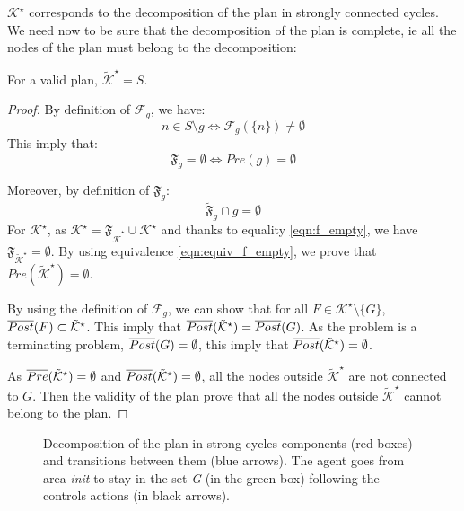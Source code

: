 $\mathcal{K}^\star$ corresponds to the decomposition of the plan in strongly connected cycles.
We need now to be sure that the decomposition of the plan is complete, ie all the nodes of the plan must belong to the decomposition:
\begin{prop}
For a valid plan, $\tilde{\mathcal{K}}^\star = S$.
\end{prop}
\begin{proof}

By definition of $\mathcal{F}_g$, we have:
\begin{equation}
n \in S \setminus g \Leftrightarrow \mathcal{F}_g(\{n\}) \neq \emptyset
\end{equation}
This imply that:
\begin{equation} \label{eqn:equiv_f_empty}
\mathfrak{F}_g = \emptyset \Leftrightarrow Pre(g) = \emptyset
\end{equation}

Moreover, by definition of $\mathfrak{F}_g$:
\begin{equation} \label{eqn:f_empty}
\tilde{\mathfrak{F}}_g \cap g = \emptyset
\end{equation}
For $\mathcal{K}^\star$, as $\mathcal{K}^\star = \mathfrak{F}_{\tilde{\mathcal{K}}^\star} \cup \mathcal{K}^\star$ and thanks to equality \ref{eqn:f_empty}, we have $\mathfrak{F}_{\tilde{\mathcal{K}}^\star} = \emptyset$.  
By using equivalence \ref{eqn:equiv_f_empty}, we prove that $Pre(\tilde{\mathcal{K}}^\star) = \emptyset$.

By using the definition of $\mathcal{F}_g$,
we can show that for all $F \in \mathcal{K}^\star \setminus \{G\}$, $\overline{Post} (F) \subset \tilde{\mathcal{K}}^\star$.
This imply that $\overline{Post} (\tilde{\mathcal{K}}^\star) = \overline{Post} (G)$.
As the problem is a terminating problem, $\overline{Post} (G) = \emptyset$, this imply that 
$\overline{Post} (\tilde{\mathcal{K}}^\star)  = \emptyset$.

As $\overline{Pre} (\tilde{\mathcal{K}}^\star)  = \emptyset$ and $\overline{Post} (\tilde{\mathcal{K}}^\star)  = \emptyset$, all the nodes outside $\tilde{\mathcal{K}}^\star$ are not connected to $G$.
Then the validity of the plan prove that all the nodes outside   $\tilde{\mathcal{K}}^\star$ cannot belong to the plan.
\end{proof}


\begin{figure}
	\center
	
	\caption{Decomposition of the plan in strong cycles components (red boxes) and transitions between them (blue arrows). The agent goes from area \textit{init} to stay in the set \textit{G} (in the green box) following the controls actions (in black arrows).}
	\label{fig:environment}
\end{figure}

